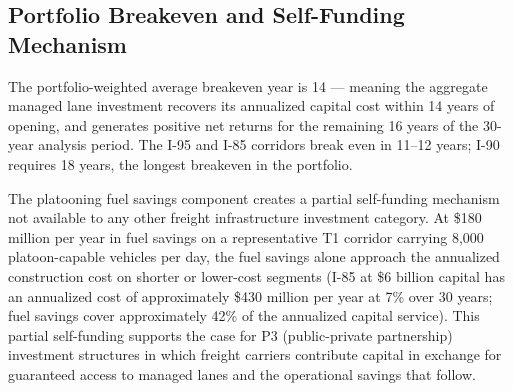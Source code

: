 \subsection{Portfolio Breakeven and Self-Funding Mechanism}

The portfolio-weighted average breakeven year is 14 --- meaning the aggregate managed lane investment recovers its annualized capital cost within 14 years of opening, and generates positive net returns for the remaining 16 years of the 30-year analysis period. The I-95 and I-85 corridors break even in 11--12 years; I-90 requires 18 years, the longest breakeven in the portfolio.

The platooning fuel savings component creates a partial self-funding mechanism not available to any other freight infrastructure investment category. At \$180 million per year in fuel savings on a representative T1 corridor carrying 8,000 platoon-capable vehicles per day, the fuel savings alone approach the annualized construction cost on shorter or lower-cost segments (I-85 at \$6 billion capital has an annualized cost of approximately \$430 million per year at 7\% over 30 years; fuel savings cover approximately 42\% of the annualized capital service). This partial self-funding supports the case for P3 (public-private partnership) investment structures in which freight carriers contribute capital in exchange for guaranteed access to managed lanes and the operational savings that follow.
